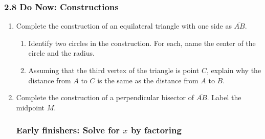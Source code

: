 \documentclass[12pt, twoside]{article}
\begin{document}
  \subsubsection*{2.8 Do Now: Constructions}

  \begin{enumerate}
    \item Complete the construction of an equilateral triangle with one side as $\overline{AB}$. \vspace{3cm}
    \begin{center}
    \end{center} \vspace{3cm}
    \begin{enumerate}
      \item Identify two circles in the construction. For each, name the center of the circle and the radius.  \vspace{3cm}
      \item Assuming that the third vertex of the triangle is point $C$, explain why the distance from $A$ to $C$ is the same as the distance from $A$ to $B$.
    \end{enumerate}

  \newpage

    \item Complete the construction of a perpendicular bisector of $\overline{AB}$. Label the midpoint $M$. \vspace{2cm}
    \begin{center}
    \end{center} \vspace{3cm}

    \subsubsection*{Early finishers: Solve for $x$ by factoring}


\end{enumerate}
\end{document}
